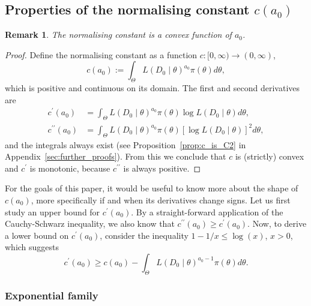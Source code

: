 \documentclass[a4paper, notitlepage, 11pt]{article}
\newtheorem{remark}{Remark}[]
\begin{document}
\subsection{Properties of the normalising constant $c(a_0)$}

\begin{remark}
\label{rmk:convex_norm_constant}
 The normalising constant is a convex function of $a_0$.
\end{remark}
\begin{proof}
Define the normalising constant as a function $c : [0, \infty) \to (0, \infty)$,
\begin{equation}
 \label{eq:normconst}
 c(a_0) := \int_{\Theta} L(D_0\mid\theta)^{a_0} \pi(\theta)d\theta,
\end{equation}
which is positive and continuous on its domain.
The first and second derivatives are
\begin{align}
\label{eq:derivative_ca0}
c^\prime(a_0) &= \int_{\Theta} L(D_0\mid\theta)^{a_0} \pi(\theta) \log L(D_0\mid\theta) d\theta, \\
c^{\prime\prime}(a_0) &= \int_{\Theta} L(D_0\mid\theta)^{a_0} \pi(\theta) [\log L(D_0\mid\theta)]^2 d\theta,
\end{align}
and the integrals always exist (see Proposition~\ref{prop:c_is_C2} in Appendix~\ref{sec:further_proofs}). %
From this we conclude that $c$ is (strictly) convex and $c^\prime$ is monotonic, because $c^{\prime\prime}$ is always positive.
\end{proof}
For the goals of this paper, it would be useful to know more about the shape of $c(a_0)$, more specifically if and when its derivatives change signs.
Let us first study an upper bound for $c^\prime(a_0)$.
By a straight-forward application of the Cauchy-Schwarz inequality, we also know that $c^{\prime\prime}(a_0) \geq c^\prime(a_0)$.
Now, to derive a lower bound on $c^\prime(a_0)$, consider the inequality $ 1- 1/x \leq \log(x)$, $x >0$, which suggests
\begin{equation*}
 \label{eq:c_a0_deriv_lb}
 c^\prime(a_0) \geq c(a_0) - \int_{\Theta} L(D_0\mid\theta)^{a_0-1} \pi(\theta) d\theta.
\end{equation*}


\subsubsection{Exponential family}
\end{document}
